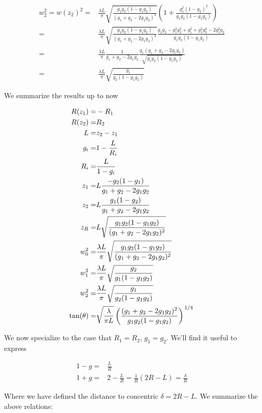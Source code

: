 \documentclass[12pt]{article}
\newcommand{\slfrac}[2]{\left.#1\middle/#2\right.}
\begin{document}
\begin{align}
w_2^2 = w(z_2)^2 =& \frac{\lambda L}{\pi} \sqrt{\frac{g_1g_2(1-g_1g_2)}{(g_1+g_2-2g_1g_2)^2}}\left(1+\frac{g_1^2(1-g_2)^2}{g_1g_2(1-g_1g_2)}\right)\\
=& \frac{\lambda L}{\pi} \sqrt{\frac{g_1g_2(1-g_1g_2)}{(g_1+g_2-2g_1g_2)^2}} \frac{g_1g_2 - g_1^2 g_2^2 + g_1^2 + g_1^2g_2^2 - 2 g_1^2 g_2}{g_1g_2(1-g_1g_2)}\\
=& \frac{\lambda L}{\pi} \frac{1}{g_1 + g_2 - 2g_1 g_2} \frac{g_1(g_1+g_2 - 2g_1g_2)}{\sqrt{g_1 g_2(1-g_1g_2)}}\\
=& \frac{\lambda L}{\pi} \sqrt{\frac{g_1}{g_2(1-g_1g_2)}}
\end{align}

We summarize the results up to now

\begin{align}
R(z_1) =& -R_1\\
R(z_2) =& R_2\\
L =& z_2-z_1\\
g_i =& 1-\frac{L}{R_i}\\
R_i =& \frac{L}{1-g_i}\\
z_1 =& L \frac{-g_2(1-g_1)}{g_1+g_2 - 2 g_1 g_2}\\
z_2 =& L \frac{g_1(1-g_2)}{g_1+g_2-2g_1g_2}\\
z_R =& L \sqrt{\frac{g_1 g_2(1-g_1g_2)}{(g_1+g_2-2g_1g_2)^2}}\\
w_0^2 =& \frac{\lambda L}{\pi}\sqrt{\frac{g_1g_2(1-g_1g_2)}{(g_1+g_2-2g_1g_2)^2}}\\
w_1^2 =& \frac{\lambda L}{\pi} \sqrt{\frac{g_2}{g_1(1-g_1g_2)}}\\
w_2^2 =& \frac{\lambda L}{\pi} \sqrt{\frac{g_1}{g_2(1-g_1g_2)}}\\
\tan(\theta) =& \sqrt{\frac{\lambda}{\pi L}}\left(\frac{(g_1+g_2 - 2g_1 g_2)^2}{g_1g_2(1-g_1g_2)}\right)^{\slfrac{1}{4}}
\end{align}

We now specialize to the case that $R_1 = R_2$, $g_1 = g_2$.
We'll find it useful to express

\begin{align}
1-g =& \frac{L}{R}\\
1+g =& 2-\frac{L}{R} = \frac{1}{R}(2R-L) = \frac{\delta}{R}
\end{align}

Where we have defined the distance to concentric $\delta = 2R-L$.
We summarize the above relations:
\end{document}
